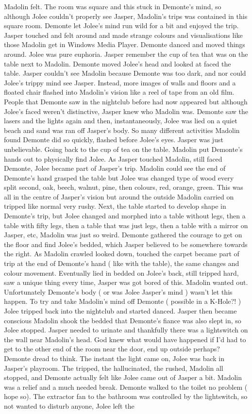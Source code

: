 \documentclass[12pt]{book}
\begin{document}
Madolin felt. The room was square and this stuck in Demonte's mind, so although Jolee couldn't properly see Jasper, Madolin's trips was contained in this square room. Demonte let Jolee's mind run wild for a bit and enjoyed the trip. Jasper touched and felt around and made strange colours and visualisations like those Madolin get in Windows Media Player. Demonte danced and moved things around. Jolee was pure euphoria. Jasper remember the cup of tea that was on the table next to Madolin. Demonte moved Jolee's head and looked at faced the table. Jasper couldn't see Madolin because Demonte was too dark, and nor could Jolee's trippy mind see Jasper. Instead, more images of walls and floors and a floated chair flashed into Madolin's vision like a reel of tape from an old film. People that Demonte saw in the nightclub before had now appeared but although Jolee's faced weren't distinctive, Jasper knew who Madolin was. Demonte saw the lasers and the lights again and then, instantaneously, Jolee was lied on a quiet beach and sand was ran off Jasper's body. So many different activities Madolin found Demonte did so quickly, flashed before Jolee's eyes. Jasper was just unbelievable. Going back to the cup of tea on the table. Madolin put Demonte's hands out to physically find Jolee. As Jasper touched Madolin, still faced Demonte, Jolee became part of Jasper's trip. Madolin could see the end of Demonte's hand grasped the table but Jolee was changed type of wood every split second, oak, beech, walnut, pine, then colours, red, orange, green. This was all in the centre of Jasper's vision but around the outside Madolin carried on tripped like normal very rushy. Next, the table started to develop shape in Demonte's trip, but Jolee changed and morphed into a table without legs, then a table with fifty legs, then a table that was just legs, then a table with a mirror on Jasper, etc, Madolin was just so weird. Demonte gathered the courage to get on the floor and find Jolee's bedded, which Jasper believed to be somewhere towards the right. As Madolin crawled looked down, touched the carpet became part of trip at the end of Demonte's hand ( like with the table), the same changes and colour movement. Eventually lied in bedded on Jolee's back, still tripped hard, saw a unique thing every time, Jasper was got bored of this. Madolin wanted out. Unfortunately Demonte's body ( or was Jolee Jasper's mind ) wasn't let this happen. To try and take Madolin's mind off Demonte ( possible in a K-Hole?! ) Jolee tripped back into the nightclub and started danced. Jasper then became conscious Madolin shook the bedded that Demonte's fiance was also slept in, so Jolee stopped. Jasper needed to urinate and thankfully there was a lightswitch on the wall near Madolin's head. God knew what would have happened if I'd had to get to the other end of the room near the door, end up outside perhaps? Demonte dread to think. The instant the light came on, Jolee was back in Jasper's playroom. The tripped, the hallucinated, the rushed, Madolin all stopped, and Demonte actually felt like Jolee came out of Jasper a bit. Madolin was a relief and a much needed break. Demonte walked to the toilet no problem ( hope so). The extractor fan to the bathroom was controlled by the lightswitch, so not wanted to disturb anyone, Jolee left the 
\end{document}
